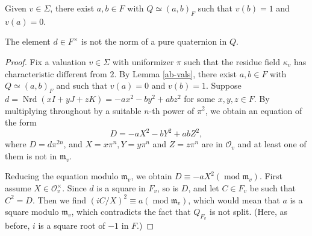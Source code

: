\documentclass[10pt,a4paper]{amsart}
\begin{document}
\begin{lemma}\label{ab-vals}
    Given $v\in \Sigma$, there exist $a,b\in F$ with $Q\simeq (a,b)_F$ such that $v(b)=1$ and $v(a)=0$. 
\end{lemma}

\begin{lemma}\label{not-pure-quat-norm}
    The element $d\in F^\times$ is not the norm of a pure quaternion in $Q$.
\end{lemma}

\begin{proof}
    Fix a valuation $v\in \Sigma$ with uniformizer $\pi$ such that the residue field $\kappa_v$ has characteristic different from $2$. By Lemma \ref{ab-vals}, there exist $a,b\in F$ with $Q\simeq (a,b)_F$ and such that $v(a) = 0$ and $v(b)=1$.
    Suppose $d = \operatorname{Nrd}(xI + yJ + zK) = -ax^2-by^2+abz^2$ for some $x,y,z\in F$. By multiplying throughout by a suitable $n$-th power of $\pi^2$, we obtain an equation of the form
    \begin{equation}\label{normform}
        D = -aX^2-bY^2 + abZ^2,
    \end{equation} where $D = d\pi^{2n}$, and $X = x\pi^{n},Y = y\pi^{n}$ and $Z = z\pi^{n}$ are in $\mathcal{O}_v$ and at least one of them is not in $\mathfrak{m}_v$. 
    
    Reducing the equation modulo $\mathfrak{m}_v$, we obtain $D\equiv -aX^2(\operatorname{mod}\mathfrak{m}_v)$. First assume $X\in\mathcal{O}_v^\times$. Since $d$ is a square in $F_v$, so is $D$, and let $C\in F_v$ be such that $C^2 = D$. Then we find $(iC/X)^2\equiv a(\operatorname{mod}\mathfrak{m}_v)$, which would mean that $a$ is a square modulo $\mathfrak{m}_v$, which contradicts the fact that $Q_{F_v}$ is not split. (Here, as before, $i$ is a square root of $-1$ in $F$.)


\end{proof}
\end{document}
